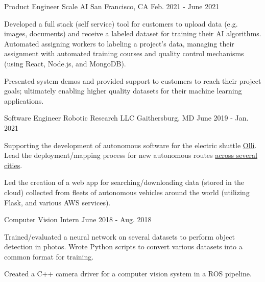 
\begin{cventries}
  \cventry
    {Product Engineer} %
    {Scale AI} %
    {San Francisco, CA} %
    {Feb. 2021 - June 2021} %
    {
      \begin{cvitems} %
      \item {Developed a full stack (self service) tool for customers to upload data (e.g. images, documents) and receive a labeled dataset for training their AI algorithms.  Automated assigning workers to labeling a project's data, managing their assignment with automated training courses and quality control mechanisms (using React, Node.js, and MongoDB).}
        \item {Presented system demos and provided support to customers to reach their project goals; ultimately enabling higher quality datasets for their machine learning applications.}
      \end{cvitems}
    }

  \cventry
    {Software Engineer} %
    {Robotic Research LLC} %
    {Gaithersburg, MD} %
    {June 2019 - Jan. 2021} %
    {
      \begin{cvitems} %
        \item {Supporting the development of autonomous software for the electric 
          shuttle \href{https://localmotors.com/olli}{Olli}.  Lead the deployment/mapping process for new autonomous routes \href{https://localmotors.com/deployments}{across several cities}.}
      \item {Led the creation of a web app for searching/downloading data (stored in the cloud) collected from fleets of autonomous vehicles around the world (utilizing Flask, and various AWS services).}
      \end{cvitems}
    }

  \cventry
    {Computer Vision Intern} %
    {} %
    {} %
    {June 2018 - Aug. 2018} %
    {
      \begin{cvitems} %
        \item {Trained/evaluated a neural network on several datasets to perform object detection in 
photos.  Wrote Python scripts to convert various datasets into a common format for 
training.}
        \item {Created a C++ camera driver for a computer vision system in a ROS pipeline.}
      \end{cvitems}
    }


\end{cventries}
